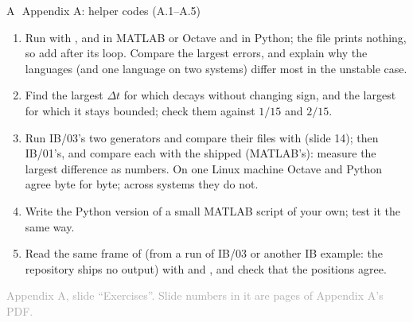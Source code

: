 \documentclass[aspectratio=169,11pt]{beamer}
\newcommand{\sourcecredit}[1]{\vfill\begin{flushright}\tiny\textcolor{DarkGray}{#1}\end{flushright}}
\begin{document}
\begin{frame}{A\,\textbullet\ Appendix A: helper codes (A.1--A.5)}
\label{fr:cAx1}
\footnotesize
\begin{enumerate}\setlength{\itemsep}{2pt}
  \item[A.1] Run  with ,  and  in MATLAB or Octave and in Python; the  file prints nothing, so add  after its loop. Compare the largest errors, and explain why the languages (and one language on two systems) differ most in the unstable case.
  \item[A.2] Find the largest $\Delta t$ for which  decays without changing sign, and the largest for which it stays bounded; check them against $1/15$ and $2/15$.
  \item[A.3] Run IB/03's two generators and compare their files with  (slide 14); then IB/01's, and compare each  with the shipped  (MATLAB's): measure the largest difference as numbers. On one Linux machine Octave and Python agree byte for byte; across systems they do not.
  \item[A.4] Write the Python version of a small MATLAB script of your own; test it the same way.
  \item[A.5] Read the same frame of  (from a run of IB/03 or another IB example: the repository ships no output) with  and , and check that the positions agree.
\end{enumerate}
\sourcecredit{Appendix A, slide ``Exercises''. Slide numbers in it are pages of Appendix A's PDF.}
\end{frame}
\end{document}
